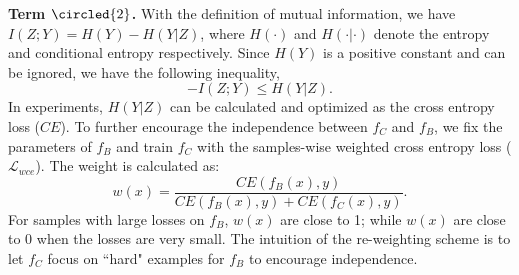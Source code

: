 \noindent \textbf{Term $\circled{2}$.} With the definition of mutual information, we have $I (Z;Y) = H (Y)-H (Y|Z)$, where $H(\cdot)$ and $H(\cdot|\cdot)$ denote the entropy and conditional
entropy respectively. Since $H (Y)$ is a positive constant and can be ignored, we have the following inequality,
\begin{equation}
    -I(Z;Y)\le  H(Y|Z).
\end{equation}
In experiments, $H(Y|Z)$ can be calculated and optimized as the cross entropy loss ($CE$). To further encourage the independence between $f_C$ and $f_B$,
we fix the parameters of $f_B$ and train $f_C$ with the samples-wise weighted cross entropy loss ($\mathcal{L}_{wce}$). The weight is calculated as:
\begin{equation}
    w(x) = \frac{CE(f_B(x), y)}{CE(f_B(x),y)+CE(f_C(x),y)}.
\end{equation}
For samples with large losses on $f_B$, $w(x)$ are close to 1; while $w(x)$ are close to 0 when the losses are very small. The intuition of the re-weighting scheme is to let $f_C$ focus on ``hard" examples for $f_B$ to encourage independence. 

